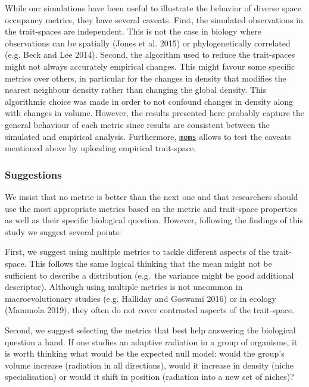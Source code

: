 \documentclass[]{article}
\begin{document}
While our simulations have been useful to illustrate the behavior of
diverse space occupancy metrics, they have several caveats. First, the
simulated observations in the trait-spaces are independent. This is not
the case in biology where observations can be spatially (Jones et al.
2015) or phylogenetically correlated (e.g. Beck and Lee 2014). Second,
the algorithm used to reduce the trait-spaces might not always
accurately empirical changes. This might favour some specific metrics
over others, in particular for the changes in density that modifies the
nearest neighbour density rather than changing the global density. This
algorithmic choice was made in order to not confound changes in density
along with changes in volume. However, the results presented here
probably capture the general behaviour of each metric since results are
consistent between the simulated and empirical analysis. Furthermore,
\href{https://tguillerme.shinyapps.io/moms/}{\texttt{moms}} allows to
test the caveats mentioned above by uploading empirical trait-space.

\subsubsection{Suggestions}\label{suggestions}

We insist that no metric is better than the next one and that
researchers should use the most appropriate metrics based on the metric
and trait-space properties as well as their specific biological
question. However, following the findings of this study we suggest
several points:

First, we suggest using multiple metrics to tackle different aspects of
the trait-space. This follows the same logical thinking that the mean
might not be sufficient to describe a distribution (e.g.~the variance
might be good additional descriptor). Although using multiple metrics is
not uncommon in macroevolutionary studies (e.g. Halliday and Goswami
2016) or in ecology (Mammola 2019), they often do not cover contrasted
aspects of the trait-space.

Second, we suggest selecting the metrics that best help answering the
biological question a hand. If one studies an adaptive radiation in a
group of organisms, it is worth thinking what would be the expected null
model: would the group's volume increase (radiation in all directions),
would it increase in density (niche specialisation) or would it shift in
position (radiation into a new set of niches)?
\end{document}

